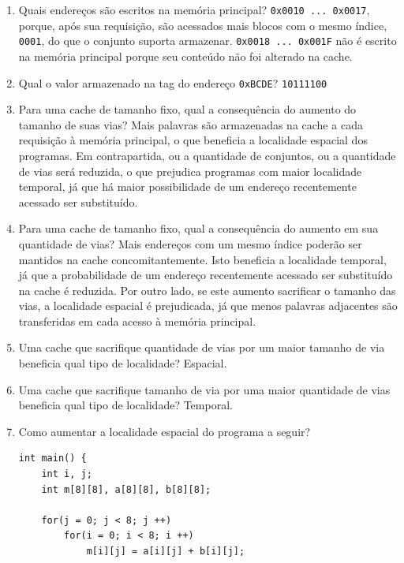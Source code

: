 \documentclass{article}
\begin{document}
\begin{enumerate}
\item Quais endereços são escritos na memória principal? \verb|0x0010 ... 0x0017|, porque, após sua requisição, são acessados mais blocos com o mesmo índice, \verb|0001|, do que o conjunto suporta armazenar. \verb|0x0018 ... 0x001F| não é escrito na memória principal porque seu conteúdo não foi alterado na cache.

\item Qual o valor armazenado na tag do endereço \verb|0xBCDE|? \verb|10111100|

\item Para uma cache de tamanho fixo, qual a consequência do aumento do tamanho de suas vias? Mais palavras são armazenadas na cache a cada requisição à memória principal, o que beneficia a localidade espacial dos programas. Em contrapartida, ou a quantidade de conjuntos, ou a quantidade de vias será reduzida, o que prejudica programas com maior localidade temporal, já que há maior possibilidade de um endereço recentemente acessado ser substituído.

\item Para uma cache de tamanho fixo, qual a consequência do aumento em sua quantidade de vias? Mais endereços com um mesmo índice poderão ser mantidos na cache concomitantemente. Isto beneficia a localidade temporal, já que a probabilidade de um endereço recentemente acessado ser substituído na cache é reduzida. Por outro lado, se este aumento sacrificar o tamanho das vias, a localidade espacial é prejudicada, já que menos palavras adjacentes são transferidas em cada acesso à memória principal.

\item Uma cache que sacrifique quantidade de vias por um maior tamanho de via beneficia qual tipo de localidade? Espacial.

\item Uma cache que sacrifique tamanho de via por uma maior quantidade de vias beneficia qual tipo de localidade? Temporal.

\item Como aumentar a localidade espacial do programa a seguir?

\begin{center}
    \begin{minipage}{0.575\textwidth}
        \begin{lstlisting}[frame=single]
int main() {
    int i, j;
    int m[8][8], a[8][8], b[8][8]; 
    
    for(j = 0; j < 8; j ++)
        for(i = 0; i < 8; i ++)
            m[i][j] = a[i][j] + b[i][j];
    

\end{lstlisting}
\end{minipage}
\end{center}
\end{enumerate}
\end{document}
